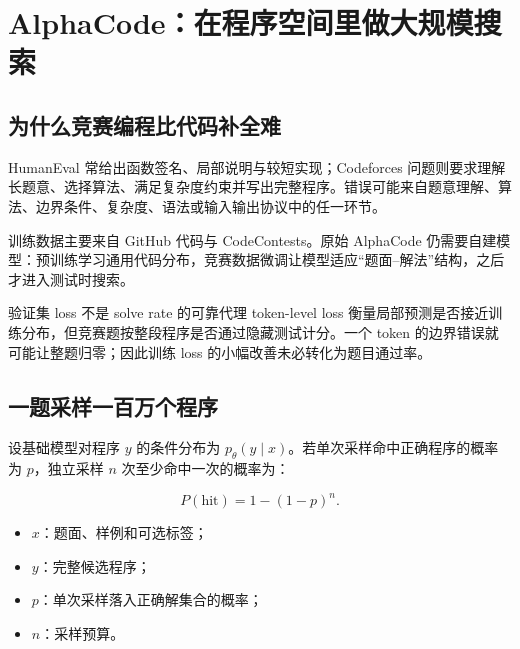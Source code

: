 \section{AlphaCode：在程序空间里做大规模搜索}

\subsection{为什么竞赛编程比代码补全难}

HumanEval 常给出函数签名、局部说明与较短实现；Codeforces 问题则要求理解长题意、选择算法、满足复杂度约束并写出完整程序。错误可能来自题意理解、算法、边界条件、复杂度、语法或输入输出协议中的任一环节。


训练数据主要来自 GitHub 代码与 CodeContests。原始 AlphaCode 仍需要自建模型：预训练学习通用代码分布，竞赛数据微调让模型适应“题面--解法”结构，之后才进入测试时搜索。

\begin{warningbox}{验证集 loss 不是 solve rate 的可靠代理}
token-level loss 衡量局部预测是否接近训练分布，但竞赛题按整段程序是否通过隐藏测试计分。一个 token 的边界错误就可能让整题归零；因此训练 loss 的小幅改善未必转化为题目通过率。
\end{warningbox}

\subsection{一题采样一百万个程序}


设基础模型对程序 $y$ 的条件分布为 $p_\theta(y\mid x)$。若单次采样命中正确程序的概率为 $p$，独立采样 $n$ 次至少命中一次的概率为：

$$
P(\text{hit})=1-(1-p)^n.
$$

\begin{itemize}
    \item $x$：题面、样例和可选标签；
    \item $y$：完整候选程序；
    \item $p$：单次采样落入正确解集合的概率；
    \item $n$：采样预算。
\end{itemize}

